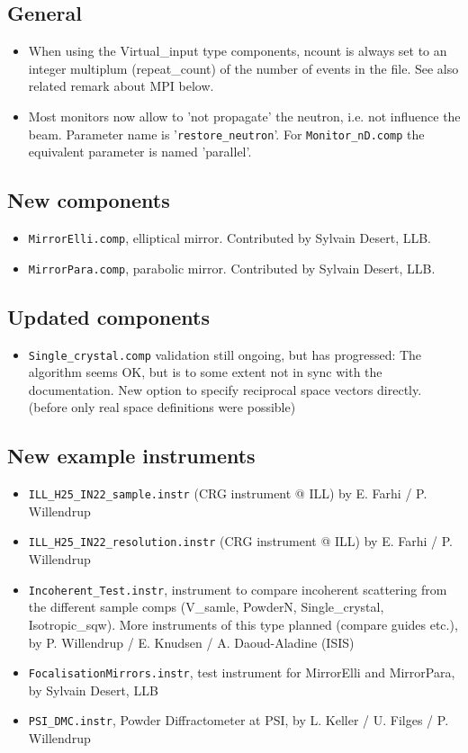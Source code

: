 \subsection{General}
\begin{itemize}
\item When using the Virtual\_input type components, \-\-ncount is always set to an integer multiplum 
     (repeat\_count) of the number of events in the file. See also
     related remark about MPI below.
\item Most monitors now allow to 'not propagate' the neutron, i.e. not influence the beam. Parameter name
     is '\verb+restore_neutron+'. For \verb+Monitor_nD.comp+ the equivalent
     parameter is named 'parallel'.
\end{itemize}
\subsection{New components}
\begin{itemize}
\item \verb+MirrorElli.comp+, elliptical mirror. Contributed by Sylvain Desert, LLB.
\item \verb+MirrorPara.comp+, parabolic mirror. Contributed by Sylvain Desert, LLB.
\end{itemize}
\subsection{Updated components}
\begin{itemize}
\item \verb+Single_crystal.comp+ validation still ongoing, but has progressed: The algorithm seems OK, but is to some
     extent not in sync with the documentation. New option to specify reciprocal space vectors directly.
     (before only real space definitions were possible)
\end{itemize}
\subsection{New example instruments}
\begin{itemize}
\item \verb+ILL_H25_IN22_sample.instr+ (CRG instrument @ ILL) by E. Farhi / P. Willendrup
\item \verb+ILL_H25_IN22_resolution.instr+ (CRG instrument @ ILL) by E. Farhi / P. Willendrup
\item \verb+Incoherent_Test.instr+, instrument to compare incoherent scattering from the different sample comps
     (V\_samle, PowderN, Single\_crystal, Isotropic\_sqw). More instruments of this type planned (compare
     guides etc.), by P. Willendrup / E. Knudsen / A. Daoud-Aladine (ISIS)
\item \verb+FocalisationMirrors.instr+,  test instrument for
  MirrorElli and MirrorPara, by  Sylvain Desert, LLB
\item \verb+PSI_DMC.instr+, Powder Diffractometer at PSI, by L. Keller / U. Filges / P. Willendrup
\end{itemize}
